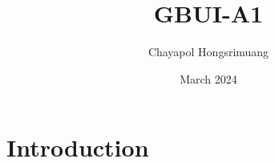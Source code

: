 \documentclass{article}
\title{GBUI-A1}
\author{Chayapol Hongsrimuang}
\date{March 2024}
\begin{document}
\maketitle

\section{Introduction}
\end{document}
